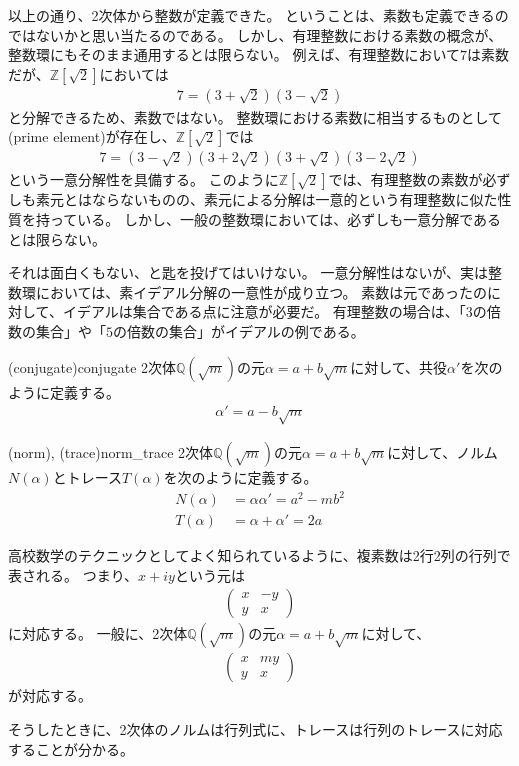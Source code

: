 以上の通り、2次体から整数が定義できた。
ということは、素数も定義できるのではないかと思い当たるのである。
しかし、有理整数における素数の概念が、整数環にもそのまま通用するとは限らない。
例えば、有理整数において$7$は素数だが、$\mathbb{Z}[\sqrt{2}]$においては
\begin{align*}
7 = (3 + \sqrt{2})(3 - \sqrt{2})
\end{align*}
と分解できるため、素数ではない。
整数環における素数に相当するものとして(prime element)が存在し、$\mathbb{Z}[\sqrt{2}]$では
\begin{align*}
7 = (3 - \sqrt{2})(3 + 2\sqrt{2})(3 + \sqrt{2})(3 - 2\sqrt{2})
\end{align*}
という一意分解性を具備する。
このように$\mathbb{Z}[\sqrt{2}]$では、有理整数の素数が必ずしも素元とはならないものの、素元による分解は一意的という有理整数に似た性質を持っている。
しかし、一般の整数環においては、必ずしも一意分解であるとは限らない。

それは面白くもない、と匙を投げてはいけない。
一意分解性はないが、実は整数環においては、素イデアル分解の一意性が成り立つ。
素数は元であったのに対して、イデアルは集合である点に注意が必要だ。
有理整数の場合は、「$3$の倍数の集合」や「$5$の倍数の集合」がイデアルの例である。

\begin{Defi}{(conjugate)}{conjugate}
2次体$\mathbb{Q}(\sqrt{m})$の元$\alpha=a+b\sqrt{m}$に対して、共役$\alpha'$を次のように定義する。
\begin{align*}
\alpha' = a - b\sqrt{m}
\end{align*}
\end{Defi}

\begin{Defi}{(norm), (trace)}{norm_trace}
2次体$\mathbb{Q}(\sqrt{m})$の元$\alpha=a+b\sqrt{m}$に対して、ノルム$N(\alpha)$とトレース$T(\alpha)$を次のように定義する。
\begin{align*}
N(\alpha) &= \alpha\alpha' = a^2 - mb^2\\
T(\alpha) &= \alpha + \alpha' = 2a
\end{align*}
\end{Defi}

高校数学のテクニックとしてよく知られているように、複素数は2行2列の行列で表される。
つまり、$x+iy$という元は
\begin{align*}
\begin{pmatrix}
x & -y \\
y & x
\end{pmatrix}
\end{align*}
に対応する。
一般に、2次体$\mathbb{Q}(\sqrt{m})$の元$\alpha=a+b\sqrt{m}$に対して、
\begin{align*}
\begin{pmatrix}
x & my \\
y & x
\end{pmatrix}
\end{align*}
が対応する。

そうしたときに、2次体のノルムは行列式に、トレースは行列のトレースに対応することが分かる。

